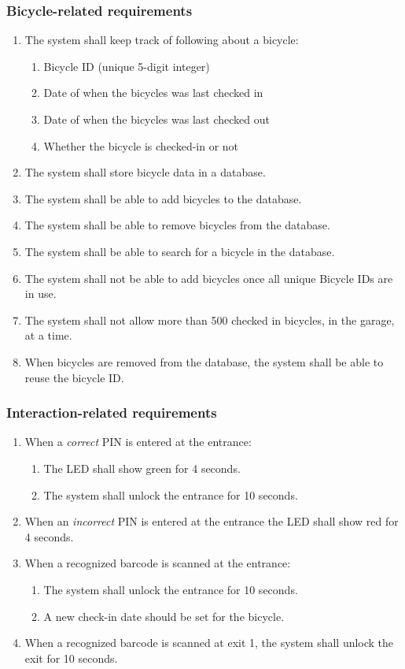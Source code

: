 \documentclass[12pt,titlepage,bibliography=totoc]{article}
\begin{document}
\subsubsection{Bicycle-related requirements}
\begin{enumerate}
	\item The system shall keep track of following about a bicycle:
	\begin{enumerate}
		\item Bicycle ID (unique 5-digit integer)
		\item Date of when the bicycles was last checked in
		\item Date of when the bicycles was last checked out
		\item Whether the bicycle is checked-in or not
	\end{enumerate}
	\item The system shall store bicycle data in a database.
	\item The system shall be able to add bicycles to the database.
	\item The system shall be able to remove bicycles from the database.
	\item The system shall be able to search for a bicycle in the database.
	\item The system shall not be able to add bicycles once all unique Bicycle IDs are in use.
	\item The system shall not allow more than 500 checked in bicycles, in the garage, at a time.
	\item When bicycles are removed from the database, the system shall be able to reuse the bicycle ID.
\end{enumerate}
\subsubsection{Interaction-related requirements}
\begin{enumerate}
	\item When a \emph{correct} PIN is entered at the entrance:
		\begin{enumerate}
			\item The LED shall show green for 4 seconds.
			\item The system shall unlock the entrance for 10 seconds.
		\end{enumerate}
	\item When an \emph{incorrect} PIN is entered at the entrance the LED shall show red for 4 seconds.
	\item When a recognized barcode is scanned at the entrance:
		\begin{enumerate}
			\item The system shall unlock the entrance for 10 seconds.
			\item A new check-in date should be set for the bicycle.
		\end{enumerate}
	\item When a recognized barcode is scanned at exit 1, the system shall unlock the exit for 10 seconds.
\end{enumerate}
\end{document}
